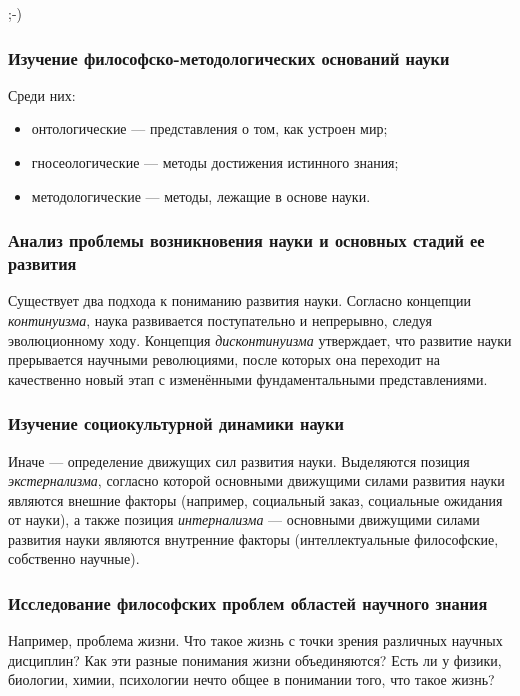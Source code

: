 ;-)

\subsubsection{Изучение философско-методологических оснований науки}

Среди них:
\begin{itemize}
    \item онтологические --- представления о том, как устроен мир;
    \item гносеологические --- методы достижения истинного знания;
    \item методологические --- методы, лежащие в основе науки.
\end{itemize}
 
\subsubsection{Анализ проблемы возникновения науки и основных стадий ее развития
}
Существует два подхода к пониманию развития науки. Согласно концепции \textit{континуизма}, наука развивается поступательно и непрерывно, следуя эволюционному ходу. Концепция \textit{дисконтинуизма} утверждает, что развитие науки прерывается научными революциями, после которых она переходит на качественно новый этап с изменёнными фундаментальными представлениями.
    
\subsubsection{Изучение социокультурной динамики науки}

Иначе --- определение движущих сил развития науки. Выделяются позиция \textit{экстернализма}, согласно которой основными движущими силами развития науки являются внешние факторы (например, социальный заказ, социальные ожидания от науки), а также позиция \textit{интернализма} --- основными движущими силами развития науки являются внутренние факторы (интеллектуальные философские, собственно научные).
    
\subsubsection{Исследование философских проблем областей научного знания} 

Например, проблема жизни. Что такое жизнь с точки зрения различных научных дисциплин? Как эти разные понимания жизни объединяются? Есть ли у физики, биологии, химии, психологии нечто общее в понимании того, что такое жизнь? 

